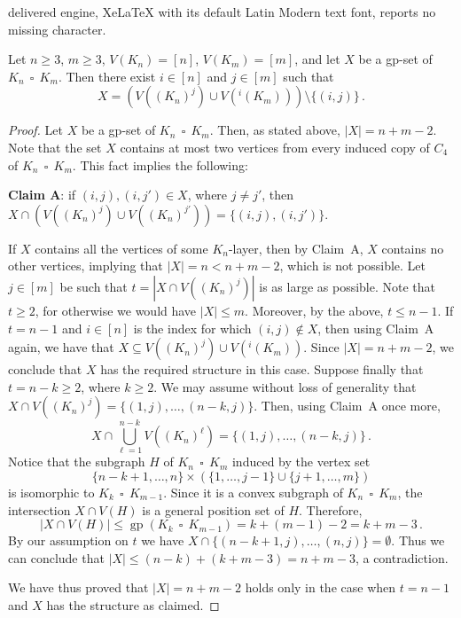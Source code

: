 \documentclass[10pt,a4paper]{amsart}
\DeclareMathOperator{\cp}{\,\square\,}
\DeclareMathOperator{\gp}{gp}
\begin{document}
delivered engine, XeLaTeX with its default Latin Modern text font, reports no missing character.
	\begin{lemma}
		\label{lem:unique-gp-in-Hamming}
		Let $n\ge 3$, $m\ge 3$, $V(K_n) = [n]$, $V(K_m) = [m]$, and let $X$ be a gp-set of $K_n\cp K_m$. Then there exist $i\in [n]$ and $j\in [m]$ such that 
		$$X = \left( V((K_n)^j) \cup V(^i(K_m))\right )\setminus \{(i,j)\}\,.$$ 
	\end{lemma}

	\begin{proof}
		Let $X$ be a gp-set of $K_n\cp K_m$. Then, as stated above, $|X| = n + m - 2$. Note that the set $X$ contains at most two vertices from every induced copy of $C_4$ of $K_n\cp K_m$. This fact implies the following: 
		
		\medskip\noindent
		{\bf Claim A}: if $(i,j), (i,j')\in X$, where $j\ne j'$, then 
		$X \cap \left( V((K_n)^j) \cup V((K_n)^{j'})  \right) = \{(i,j), (i,j')\}$. 
		
		\medskip
		If $X$ contains all the vertices of some $K_n$-layer, then by Claim~A, $X$ contains no other vertices, implying that $|X| = n < n + m - 2$, which is not possible. Let $j\in [m]$ be such that $t = |X \cap V((K_n)^{j})|$ is as large as possible. Note that $t\ge 2$, for otherwise we would have $|X|\le m$. Moreover, by the above, $t \le n-1$. If $t = n-1$ and $i\in [n]$ is the index for which $(i,j)\notin X$, then using Claim~A again, we have that $X \subseteq V((K_n)^j) \cup V(^i(K_m))$. Since $|X| = n+m-2$, we conclude that $X$ has the required structure in this case. Suppose finally that $t=n-k\ge 2$, where $k\ge 2$. We may assume without loss of generality that $X \cap V((K_n)^j ) = \{(1,j), \ldots, (n-k,j)\}$. Then, using Claim~A once more, 
		$$X \cap \bigcup_{\ell = 1}^{n-k} V((K_n)^{\ell}) = \{(1,j), \ldots, (n-k,j)\}\,.$$
		Notice that the subgraph $H$ of $K_n\cp K_m$ induced by the vertex set 
		$$\{n-k+1, \ldots, n\} \times \left( \{1, \ldots, j-1\} \cup \{j+1, \ldots, m \} \right)$$
		is isomorphic to $K_{k} \cp K_{m-1}$. Since it is a convex subgraph of $K_n\cp K_m$, the intersection $X\cap V(H)$ is a general position set of $H$. Therefore, 
		$$|X \cap V(H)| \le \gp(K_{k} \cp K_{m-1}) = k + (m-1) - 2 = k + m - 3\,.$$ 
		By our assumption on $t$ we have $X\cap \{(n-k+1,j), \ldots, (n,j)\} = \emptyset$. Thus we can conclude that $|X| \le (n - k) + (k + m - 3) = n + m -3$, a contradiction. 
		
		We have thus proved that $|X| = n + m - 2$ holds only in the case when $t = n-1$ and $X$ has the structure as claimed. 
	\end{proof}
\end{document}
